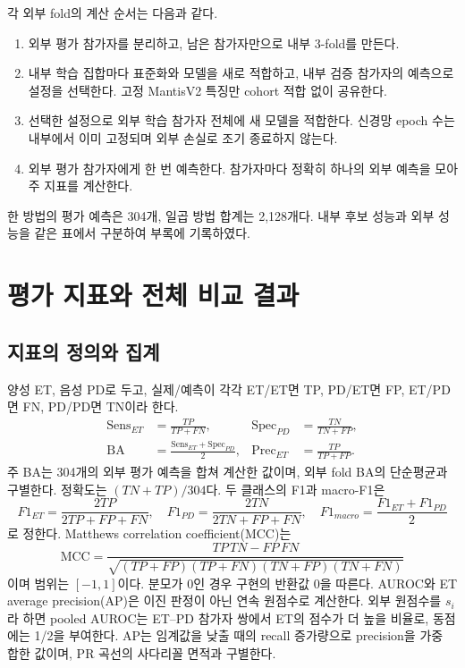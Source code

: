 \documentclass[11pt,a4paper]{article}
\DeclareMathOperator{\BA}{BA}
\numberwithin{equation}{section}
\begin{document}
각 외부 fold의 계산 순서는 다음과 같다.
\begin{enumerate}
 \item 외부 평가 참가자를 분리하고, 남은 참가자만으로 내부 3-fold를 만든다.
 \item 내부 학습 집합마다 표준화와 모델을 새로 적합하고, 내부 검증 참가자의
 예측으로 설정을 선택한다. 고정 MantisV2 특징만 cohort 적합 없이 공유한다.
 \item 선택한 설정으로 외부 학습 참가자 전체에 새 모델을 적합한다.
 신경망 epoch 수는 내부에서 이미 고정되며 외부 손실로 조기 종료하지 않는다.
 \item 외부 평가 참가자에게 한 번 예측한다. 참가자마다 정확히 하나의
 외부 예측을 모아 주 지표를 계산한다.
\end{enumerate}
한 방법의 평가 예측은 304개, 일곱 방법 합계는 2,128개다.
내부 후보 성능과 외부 성능을 같은 표에서 구분하여 부록에 기록하였다.

\section{평가 지표와 전체 비교 결과}
\subsection{지표의 정의와 집계}
양성 ET, 음성 PD로 두고, 실제/예측이 각각 ET/ET면 TP, PD/ET면 FP,
ET/PD면 FN, PD/PD면 TN이라 한다.
\begin{align}
 \mathrm{Sens}_{ET}&=\frac{TP}{TP+FN},&
 \mathrm{Spec}_{PD}&=\frac{TN}{TN+FP},\\
 \BA&=\frac{\mathrm{Sens}_{ET}+\mathrm{Spec}_{PD}}2,&
 \mathrm{Prec}_{ET}&=\frac{TP}{TP+FP}.
\end{align}
주 BA는 304개의 외부 평가 예측을 합쳐 계산한 값이며,
외부 fold BA의 단순평균과 구별한다.
정확도는 $(TN+TP)/304$다. 두 클래스의 F1과 macro-F1은
\begin{equation}
 F1_{ET}=\frac{2TP}{2TP+FP+FN},\quad
 F1_{PD}=\frac{2TN}{2TN+FP+FN},\quad
 F1_{macro}=\frac{F1_{ET}+F1_{PD}}2
\end{equation}
로 정한다. Matthews correlation coefficient(MCC)는
\begin{equation}
 \mathrm{MCC}=\frac{TP\,TN-FP\,FN}{\sqrt{(TP+FP)(TP+FN)(TN+FP)(TN+FN)}}
\end{equation}
이며 범위는 $[-1,1]$이다. 분모가 0인 경우 구현의 반환값 0을 따른다.
AUROC와 ET average precision(AP)은 이진 판정이 아닌 연속 원점수로 계산한다.
외부 원점수를 $s_i$라 하면 pooled AUROC는 ET--PD 참가자 쌍에서
ET의 점수가 더 높을 비율로, 동점에는 1/2을 부여한다.
AP는 임계값을 낮출 때의 recall 증가량으로 precision을 가중 합한 값이며,
PR 곡선의 사다리꼴 면적과 구별한다.
\end{document}
